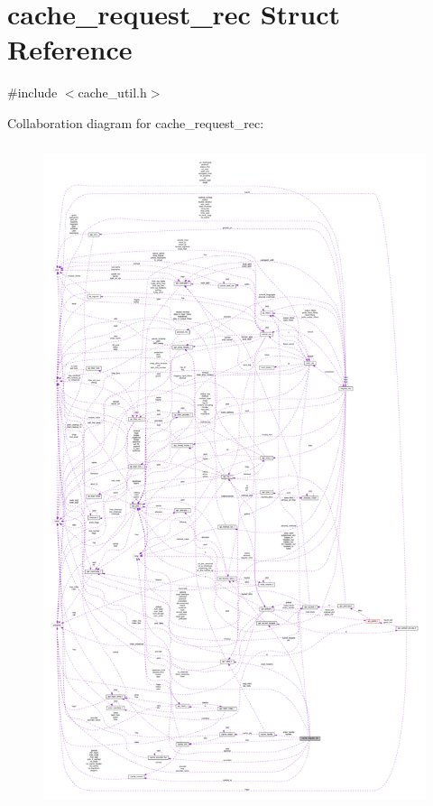 \hypertarget{structcache__request__rec}{}\section{cache\+\_\+request\+\_\+rec Struct Reference}
\label{structcache__request__rec}


{\ttfamily \#include $<$cache\+\_\+util.\+h$>$}



Collaboration diagram for cache\+\_\+request\+\_\+rec\+:
\nopagebreak
\begin{figure}[H]
\begin{center}
\leavevmode
\includegraphics[height=550pt]{structcache__request__rec__coll__graph}
\end{center}
\end{figure}
